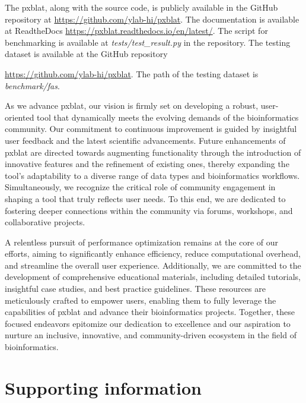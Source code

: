 \documentclass[10pt,letterpaper]{article}
\begin{document}
The \gls{pxblat}, along with the source code, is publicly available in the GitHub repository at \url{https://github.com/ylab-hi/pxblat}.
The documentation is available at ReadtheDocs \url{https://pxblat.readthedocs.io/en/latest/}.
The script for benchmarking is available at \emph{tests/test\_result.py} in the repository.
The testing dataset is available at the GitHub repository {\url{https://github.com/ylab-hi/pxblat}.
The path of the testing dataset is \emph{benchmark/fas}.


As we advance \gls{pxblat}, our vision is firmly set on developing a robust, user-oriented tool that dynamically meets the evolving demands of the bioinformatics community.
Our commitment to continuous improvement is guided by insightful user feedback and the latest scientific advancements.
Future enhancements of \gls{pxblat} are directed towards augmenting functionality through the introduction of innovative features and the refinement of existing ones, thereby expanding the tool's adaptability to a diverse range of data types and bioinformatics workflows.
Simultaneously, we recognize the critical role of community engagement in shaping a tool that truly reflects user needs.
To this end, we are dedicated to fostering deeper connections within the community via forums, workshops, and collaborative projects.

A relentless pursuit of performance optimization remains at the core of our efforts, aiming to significantly enhance efficiency, reduce computational overhead, and streamline the overall user experience.
Additionally, we are committed to the development of comprehensive educational materials, including detailed tutorials, insightful case studies, and best practice guidelines.
These resources are meticulously crafted to empower users, enabling them to fully leverage the capabilities of \gls{pxblat} and advance their bioinformatics projects.
Together, these focused endeavors epitomize our dedication to excellence and our aspiration to nurture an inclusive, innovative, and community-driven ecosystem in the field of bioinformatics.

%


\section*{Supporting information}

}
\end{document}
